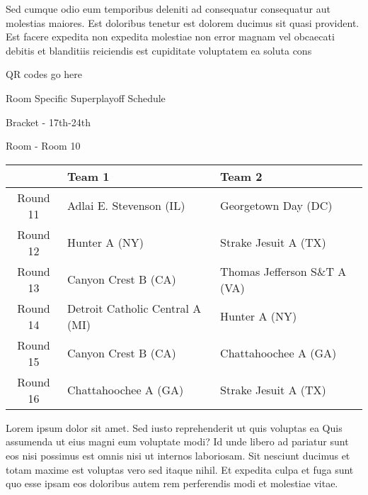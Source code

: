 \documentclass{article}%
\begin{document}
\newline%
    Sed cumque odio eum temporibus deleniti ad consequatur consequatur aut molestias maiores. Est doloribus tenetur est dolorem ducimus sit quasi provident. Est facere expedita non expedita molestiae non error magnam vel obcaecati debitis et blanditiis reiciendis est cupiditate voluptatem ea soluta cons%
\vspace*{140pt}%
\begin{center}%
\begin{Huge}%
QR codes go here%
\end{Huge}%
\end{center}%
\newpage%
\begin{center}%
\begin{Huge}%
Room Specific Superplayoff Schedule%
\end{Huge}%
\vspace*{8pt}%
\linebreak%
\begin{Large}%
Bracket {-} 17th{-}24th%
\end{Large}%
\vspace*{8pt}%
\linebreak%
\vspace*{8pt}%
\begin{Large}%
Room {-} Room 10%
\end{Large}%
\end{center}%
%
\begin{tabularx}{\textwidth}{|c|Y|Y|}%
\hline%
&Team 1&Team 2\\%
\hline%
Round 11&Adlai E. Stevenson (IL)&Georgetown Day (DC)\\%
Round 12&Hunter A (NY)&Strake Jesuit A (TX)\\%
Round 13&Canyon Crest B (CA)&Thomas Jefferson S\&T A (VA)\\%
Round 14&Detroit Catholic Central A (MI)&Hunter A (NY)\\%
Round 15&Canyon Crest B (CA)&Chattahoochee A (GA)\\%
Round 16&Chattahoochee A (GA)&Strake Jesuit A (TX)\\%
\hline%
\end{tabularx}%
\vspace*{8pt}%
\newline%
    Lorem ipsum dolor sit amet. Sed iusto reprehenderit ut quis voluptas ea Quis assumenda ut eius magni eum voluptate modi? Id unde libero ad pariatur sunt eos nisi possimus est omnis nisi ut internos laboriosam. Sit nesciunt ducimus et totam maxime est voluptas vero sed itaque nihil. Et expedita culpa et fuga sunt quo esse ipsam eos doloribus autem rem perferendis modi et molestiae vitae.\newline%
\end{document}
